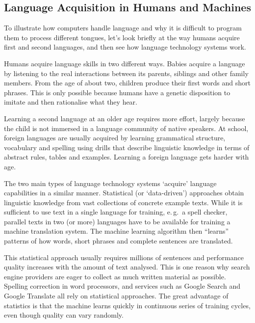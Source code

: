 \begin{multicols}{2}

\subsection{Language Acquisition in Humans and Machines}

    To illustrate how computers handle language and why it is difficult to program them to process different tongues, let’s look briefly at the way humans acquire first and second languages, and then see how language technology systems work. 

    Humans acquire language skills in two different ways. Babies acquire a language by listening to the real interactions between its parents, siblings and other family members. From the age of about two, children produce their first words and short phrases. This is only possible because humans have a genetic disposition to imitate and then rationalise what they hear. 

    Learning a second language at an older age requires more effort, largely because the child is not immersed in a language community of native speakers. At school, foreign languages are usually acquired by learning grammatical structure, vocabulary and spelling using drills that describe linguistic knowledge in terms of abstract rules, tables and examples. Learning a foreign language gets harder with age.


    The two main types of language technology systems ‘acquire’ language capabilities in a similar manner. Statistical (or ‘data-driven’) approaches obtain linguistic knowledge from vast collections of concrete example texts. While it is sufficient to use text in a single language for training, e.\,g.~a spell checker, parallel texts in two (or more) languages have to be available for training a machine translation system. The machine learning algorithm then “learns” patterns of how words, short phrases and complete sentences are translated. 

    This statistical approach usually requires millions of sentences and performance quality increases with the amount of text analysed. This is one reason why search engine providers are eager to collect as much written material as possible. Spelling correction in word processors, and services such as Google Search and Google Translate all rely on statistical approaches. The great advantage of statistics is that the machine learns quickly in continuous series of training cycles, even though quality can vary randomly.


\end{multicols}
